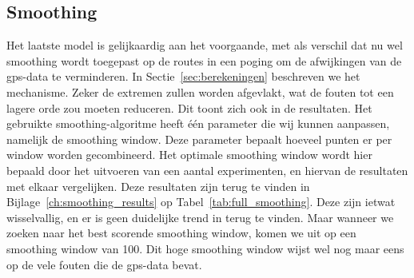 \subsection{Smoothing}
Het laatste model is gelijkaardig aan het voorgaande, met als verschil dat nu
wel smoothing wordt toegepast op de routes in een poging om de afwijkingen van
de \ac{gps}-data te verminderen. In Sectie~\ref{sec:berekeningen} beschreven we
het mechanisme. Zeker de extremen zullen worden afgevlakt, wat de fouten tot
een lagere orde zou moeten reduceren. Dit toont zich ook in de resultaten. Het
gebruikte smoothing-algoritme heeft één parameter die wij kunnen aanpassen,
namelijk de smoothing window. Deze parameter bepaalt hoeveel punten er per
window worden gecombineerd. Het optimale smoothing window wordt hier bepaald
door het uitvoeren van een aantal experimenten, en hiervan de resultaten met
elkaar vergelijken. Deze resultaten zijn terug te vinden in
Bijlage~\ref{ch:smoothing_results} op Tabel~\ref{tab:full_smoothing}. Deze zijn
ietwat wisselvallig, en er is geen duidelijke trend in terug te vinden.
Maar wanneer we zoeken naar het best scorende smoothing window, komen we uit op
een smoothing window van 100. Dit hoge smoothing window wijst wel nog maar eens
op de vele fouten die de \ac{gps}-data bevat.

